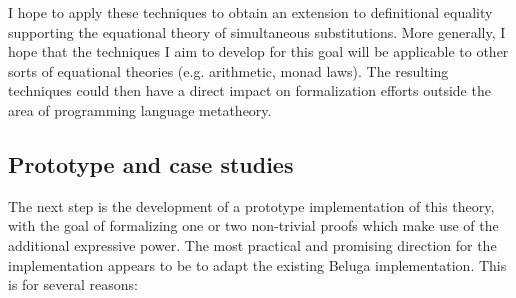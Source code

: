 \documentclass{article}
\newcommand{\LONGVERSION}[1]{{\color{light-gray}#1}}
\begin{document}
I hope to apply these techniques to obtain an extension to
definitional equality supporting the
equational theory of simultaneous substitutions. More generally, I
hope that the techniques I aim to develop for this goal will be applicable to other sorts
of equational theories (e.g. arithmetic, monad laws). The resulting techniques could then have a
direct impact on formalization efforts outside the area of programming
language metatheory.










\subsection{Prototype and case studies}\label{sec:prototype}
The next step is the development of a prototype implementation of this
theory, with the goal of formalizing one or two non-trivial proofs
which make use of the additional expressive power. 
The most practical and promising direction for the implementation
appears to be to adapt the existing Beluga implementation. This is for
several reasons:
\end{document}

